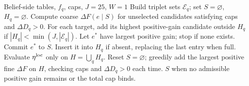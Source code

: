 \begin{table}[t]
\caption{Prediction-only adaptive C2F (released V1)}
\label{alg:adaptive_c2f}
\footnotesize
\begin{algorithmic}[1]
\REQUIRE Belief-side tables, $f_q$, caps, $J=25$, $W=1$
\STATE Build triplet sets $\mathcal E_q$; set $S=\varnothing$, $H_q=\varnothing$.
\STATE Compute coarse $\Delta F(e\mid S)$ for unselected candidates
satisfying caps and $\Delta D_q>0$.
\STATE For each target, add its highest positive-gain candidate outside
$H_q$ if $|H_q|<\min(J,|\mathcal E_q|)$.
\STATE Let $e^*$ have largest positive gain; stop if none exists.
\STATE Commit $e^*$ to $S$. Insert it into $H_q$ if absent,
replacing the last entry when full.
\ENDWHILE
\STATE Evaluate $\eta^{\rm loc}$ only on $H=\bigcup_q H_q$.
\STATE Reset $S=\varnothing$; greedily add the largest positive fine
$\Delta F$ on $H$, checking caps and $\Delta D_q>0$ each time.
\RETURN $S$ when no admissible positive gain remains or the total cap binds.
\end{algorithmic}
\end{table}

